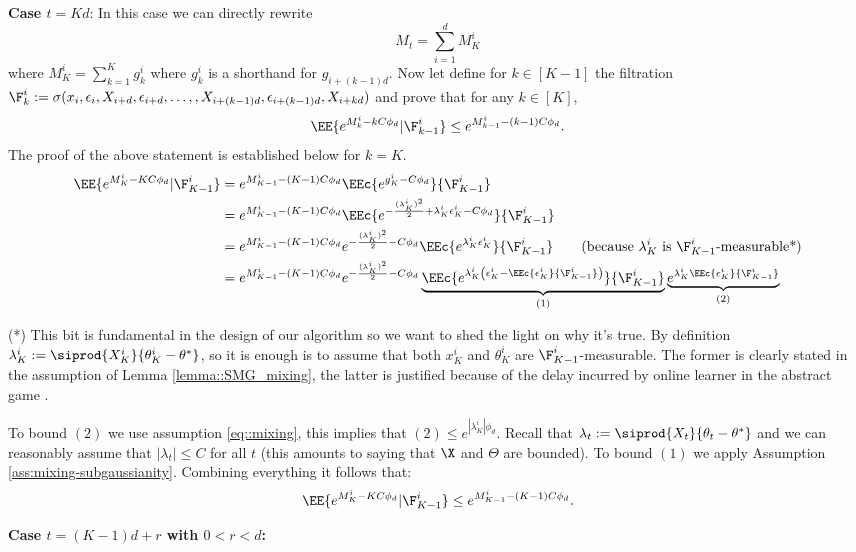 \textbf{Case $t=Kd$}:
In this case we can directly rewrite
$$M_t = \sum_{i=1}^dM_K^i$$
where $M_K^i= \sum_{k=1}^K g_k^i$ where $g_k^i$ is a shorthand for $g_{i+(k-1)d}$. Now let define for $k\in [K-1]$ the filtration $\F_k^i:= \sigma(x_i,\epsilon_i,X_{i+d},\epsilon_{i+d},\dots,,X_{i+(k-1)d},\epsilon_{i+(k-1)d},X_{i+kd})$ and prove that for any $k \in [K]$,
$$\EE{e^{M_k^i-kC\phi_d}|\F_{k-1}^i}\leq e^{M_{k-1}^i-(k-1)C\phi_d}.$$
The proof of the above statement is established below for $k=K.$
\begin{align*}
    \EE{e^{M_K^i-KC\phi_d}|\F_{K-1}^i}&=e^{M_{K-1}^i-(K-1)C\phi_d}\EEc{e^{g_K^i-C\phi_d}}{\F_{K-1}^i}\\
    &= e^{M_{K-1}^i-(K-1)C\phi_d}\EEc{e^{-\frac{(\lambda_K^i)^2} {2}+\lambda_K^i\epsilon_K^i-C\phi_d}}{\F_{K-1}^i}\\
    &= e^{M_{K-1}^i-(K-1)C\phi_d}e^{-\frac{(\lambda_K^i)^2}{2}-C\phi_d}\EEc{e^{\lambda_K^i\epsilon_K^i}}{\F_{K-1}^i} \qquad \text{(because $\lambda_K^i$ is $\F_{K-1}^i$-measurable*)}\\
    &=e^{M_{K-1}^i-(K-1)C\phi_d}e^{-\frac{(\lambda_K^i)^2}{2}-C\phi_d}\underbrace{\EEc{e^{\lambda_K^i\left(\epsilon_K^i-\EEc{\epsilon_K^i}{\F_{K-1}^i}\right)}}{\F_{K-1}^i}}_{(1)}\underbrace{e^{\lambda_K^i\EEc{\epsilon_K^i}{\F_{K-1}^i}}}_{(2)}
\end{align*}

(*) This bit is fundamental in the design of our algorithm so we want to shed the light on why it's true. By definition $\lambda_K^i:= \siprod{X_K^i}{\theta_K^i-\theta^*}$, so it is enough is to assume that both $x_K^i$ and $\theta_K^i$ are $\F_{K-1}^i$-measurable. The former is clearly stated in the assumption of Lemma \ref{lemma::SMG_mixing}, the latter is justified because of the delay incurred by online learner in the abstract game . 
 
To bound $(2)$ we use assumption \ref{eq::mixing}, this implies that $(2) \leq e^{|\lambda_K^i|\phi_d}$. Recall that $\lambda_t:=\siprod{X_t}{\theta_t-\theta^*}$ and we can reasonably assume that $|\lambda_t| \leq C$ for all $t$ (this amounts to saying that $\X$ and $\Theta$ are bounded). To bound $(1)$ we apply Assumption \ref{ass:mixing-subgaussianity}.
Combining everything it follows that:
\begin{align*}
     \EE{e^{M_K^i-KC\phi_d}|\F_{K-1}^i} \leq e^{M_{K-1}^i-(K-1)C\phi_d}.
\end{align*}

\textbf{Case $t=(K-1)d + r$ with $0<r<d$:} 

